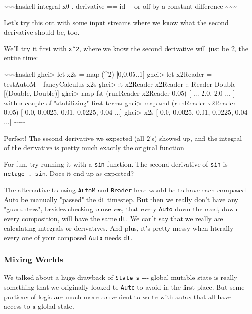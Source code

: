 \documentclass[]{article}
\begin{document}
\textasciitilde{}\textasciitilde{}\textasciitilde{}haskell integral x0 .
derivative == id -\/- or off by a constant difference
\textasciitilde{}\textasciitilde{}\textasciitilde{}

Let's try this out with some input streams where we know what the second
derivative should be, too.

We'll try it first with \texttt{x\^{}2}, where we know the second derivative
will just be 2, the entire time:

\textasciitilde{}\textasciitilde{}\textasciitilde{}haskell ghci\textgreater{}
let x2s = map (\^{}2) {[}0,0.05..1{]} ghci\textgreater{} let x2Reader =
testAutoM\_ fancyCalculus x2s ghci\textgreater{} :t x2Reader x2Reader :: Reader
Double {[}(Double, Double){]} ghci\textgreater{} map fst (runReader x2Reader
0.05) {[} ... 2.0, 2.0 ... {]} -\/- with a couple of "stabilizing" first terms
ghci\textgreater{} map snd (runReader x2Reader 0.05) {[} 0.0, 0.0025, 0.01,
0.0225, 0.04 ...{]} ghci\textgreater{} x2s {[} 0.0, 0.0025, 0.01, 0.0225, 0.04
...{]} \textasciitilde{}\textasciitilde{}\textasciitilde{}

Perfect! The second derivative we expected (all 2's) showed up, and the integral
of the derivative is pretty much exactly the original function.

For fun, try running it with a \texttt{sin} function. The second derivative of
\texttt{sin} is \texttt{netage\ .\ sin}. Does it end up as expected?

The alternative to using \texttt{AutoM} and \texttt{Reader} here would be to
have each composed Auto be manually "passed" the \texttt{dt} timestep. But then
we really don't have any "guarantees", besides checking ourselves, that every
\texttt{Auto} down the road, down every composition, will have the same
\texttt{dt}. We can't say that we really are calculating integrals or
derivatives. And plus, it's pretty messy when literally every one of your
composed \texttt{Auto} needs \texttt{dt}.

\subsubsection{Mixing Worlds}

We talked about a huge drawback of \texttt{State\ s} -\/-\/- global mutable
state is really something that we originally looked to \texttt{Auto} to avoid in
the first place. But some portions of logic are much more convenient to write
with autos that all have access to a global state.
\end{document}

